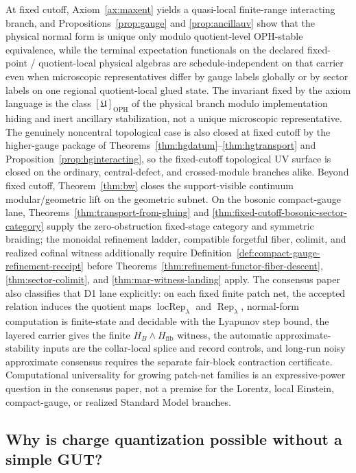 \documentclass[11pt]{article}
\begin{document}
At fixed cutoff, Axiom~\ref{ax:maxent} yields a quasi-local finite-range interacting branch, and Propositions~\ref{prop:gauge} and \ref{prop:ancillauv} show that the physical normal form is unique only modulo quotient-level OPH-stable equivalence, while the terminal expectation functionals on the declared fixed-point / quotient-local physical algebras are schedule-independent on that carrier even when microscopic representatives differ by gauge labels globally or by sector labels on one regional quotient-local glued state. The invariant fixed by the axiom language is the class \([\mathfrak U]_{\mathrm{OPH}}\) of the physical branch modulo implementation hiding and inert ancillary stabilization, not a unique microscopic representative. The genuinely noncentral topological case is also closed at fixed cutoff by the higher-gauge package of Theorems~\ref{thm:hgdatum}--\ref{thm:hgtransport} and Proposition~\ref{prop:hginteracting}, so the fixed-cutoff topological UV surface is closed on the ordinary, central-defect, and crossed-module branches alike. Beyond fixed cutoff, Theorem~\ref{thm:bw} closes the support-visible continuum modular/geometric lift on the geometric subnet. On the bosonic compact-gauge lane, Theorems~\ref{thm:transport-from-gluing} and \ref{thm:fixed-cutoff-bosonic-sector-category} supply the zero-obstruction fixed-stage category and symmetric braiding; the monoidal refinement ladder, compatible forgetful fiber, colimit, and realized cofinal witness additionally require Definition~\ref{def:compact-gauge-refinement-receipt} before Theorems~\ref{thm:refinement-functor-fiber-descent}, \ref{thm:sector-colimit}, and \ref{thm:mar-witness-landing} apply.
The consensus paper also classifies that D1 lane explicitly: on each fixed finite patch net,
the accepted relation induces the quotient maps \(\operatorname{locRep}_\lambda\) and
\(\operatorname{Rep}_\lambda\), normal-form computation is finite-state and decidable with the
Lyapunov step bound, the layered carrier gives the finite \(H_B\wedge H_{\mathrm{fib}}\) witness,
the automatic approximate-stability inputs are the collar-local splice and record controls, and
long-run noisy approximate consensus requires the separate fair-block contraction certificate.
Computational universality for growing patch-net families is an expressive-power question in the
consensus paper, not a premise for the Lorentz, local Einstein, compact-gauge, or realized
Standard Model branches.

\subsection{Why is charge quantization possible without a simple GUT?}
\end{document}
